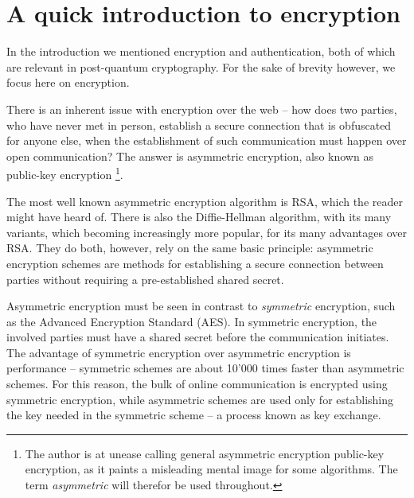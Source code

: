 \documentclass[conference]{IEEEtran}
\begin{document}
\section{A quick introduction to encryption}
In the introduction we mentioned encryption and authentication, both of which are relevant in post-quantum cryptography.
For the sake of brevity however, we focus here on encryption.

There is an inherent issue with encryption over the web -- how does two parties, who have never met in person, establish a secure connection that is obfuscated for anyone else, when the establishment of such communication must happen over open communication?
The answer is asymmetric encryption, also known as public-key encryption
\footnote{The author is at unease calling general asymmetric encryption public-key encryption, as it paints a misleading mental image for some algorithms. The term \emph{asymmetric} will therefor be used throughout.}.

The most well known asymmetric encryption algorithm is RSA, which the reader might have heard of.
There is also the Diffie-Hellman algorithm, with its many variants, which becoming increasingly more popular, for its many advantages over RSA.
They do both, however, rely on the same basic principle: asymmetric encryption schemes are methods for establishing a secure connection between parties without requiring a pre-established shared secret.


Asymmetric encryption must be seen in contrast to \emph{symmetric} encryption, such as the Advanced Encryption Standard (AES).
In symmetric encryption, the involved parties must have a shared secret before the communication initiates.
The advantage of symmetric encryption over asymmetric encryption is performance -- symmetric schemes are about 10'000 times faster than asymmetric schemes.
For this reason, the bulk of online communication is encrypted using symmetric encryption, while asymmetric schemes are used only for establishing the key needed in the symmetric scheme -- a process known as key exchange.
\end{document}

